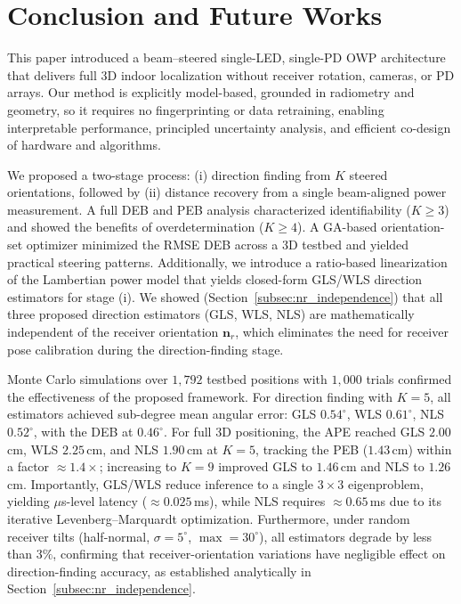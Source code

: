 \documentclass[journal]{IEEEtran}
\newcommand{\added}[1]{{\color{blue}#1}}
\begin{document}
\section{Conclusion and Future Works}
\label{sec:Conclusion}

This paper introduced a beam–steered single-LED, single-PD OWP architecture that delivers full 3D indoor localization without receiver rotation, cameras, or PD arrays. Our method is explicitly model-based, grounded in radiometry and geometry, so it requires no fingerprinting or data retraining, enabling interpretable performance, principled uncertainty analysis, and efficient co-design of hardware and algorithms.

We proposed a two-stage process: (i) direction finding from \(K\) steered orientations, followed by (ii) distance recovery from a single beam-aligned power measurement. A full \added{DEB and PEB} analysis characterized identifiability (\(K\!\ge\!3\)) and showed the benefits of overdetermination (\(K\!\ge\!4\)). A GA-based orientation-set optimizer minimized the RMSE \added{DEB} across a 3D testbed and yielded practical steering patterns. Additionally, we introduce a ratio-based linearization of the Lambertian power model that yields closed-form GLS/WLS direction estimators for stage (i). \added{We showed (Section~\ref{subsec:nr_independence}) that all three proposed direction estimators (GLS, WLS, NLS) are mathematically independent of the receiver orientation $\mathbf{n}_r$, which eliminates the need for receiver pose calibration during the direction-finding stage.}

\added{Monte Carlo simulations over $1{,}792$ testbed positions with $1{,}000$ trials confirmed the effectiveness of the proposed framework. For direction finding with $K=5$, all estimators achieved sub-degree mean angular error: GLS $0.54^\circ$, WLS $0.61^\circ$, NLS $0.52^\circ$, with the DEB at $0.46^\circ$. For full 3D positioning, the APE reached GLS $2.00$\,cm, WLS $2.25$\,cm, and NLS $1.90$\,cm at $K=5$, tracking the PEB ($1.43$\,cm) within a factor $\approx1.4\times$; increasing to $K=9$ improved GLS to $1.46$\,cm and NLS to $1.26$\,cm. Importantly, GLS/WLS reduce inference to a single $3\times3$ eigenproblem, yielding $\mu$s-level latency ($\approx0.025$\,ms), while NLS requires $\approx0.65$\,ms due to its iterative Levenberg--Marquardt optimization. Furthermore, under random receiver tilts (half-normal, $\sigma=5^\circ$, $\max=30^\circ$), all estimators degrade by less than $3\%$, confirming that receiver-orientation variations have negligible effect on direction-finding accuracy, as established analytically in Section~\ref{subsec:nr_independence}.}
\end{document}
